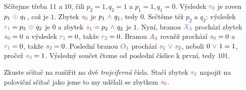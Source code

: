 Sčítejme třeba $11$ a $10$, čili $p_2 = 1, q_2 = 1$ a $p_1 = 1, q_1 = 0$.
Výsledek $\clb{r_0}$ je roven $p_1~\clb{ \oplus }~q_1$, což je $1$. Zbytek
$\clr{s_0}$ je $p_1~\clr{ \wedge }~q_1$, tedy $0$. Sečtěme též $p_2$ a $q_2$:
výsledek $\clb{r_1} = p_2~\clb{ \oplus }~q_2$ je $0$ a zbytek $\clr{s_1} =
p_2~\clr{ \wedge }~q_2$ je $1$. Nyní, branou $\clb{X_3}$ prochází zbytek
$\clr{s_0} = 0$ a výsledek $\clb{r_1} = 0$, takže $\clb{r_2} = 0$. Branou
$\clr{A_3}$ rovněž prochází $\clr{s_0} = 0$ a $\clb{r_1} = 0$, takže $\clr{s_2}
= 0$. Poslední branou $\clg{O_3}$ prochází $\clr{s_1}~\clg{ \vee }~\clr{s_2}$,
neboli $0~\clg{ \vee }~1 = 1$, pročež $\clg{s_3} = 1$. Výsledný součet
čteme od poslední číslice k první, tedy $101$.

\begin{exercise}
  Zkuste sčítač na  rozšířit na dvě
  \emph{trojciferná} čísla. Stačí zbytek $\clb{s_3}$ napojit na poloviční sčítač
  jako jsme to my udělali se zbytkem $\clr{s_0}$.
\end{exercise}
